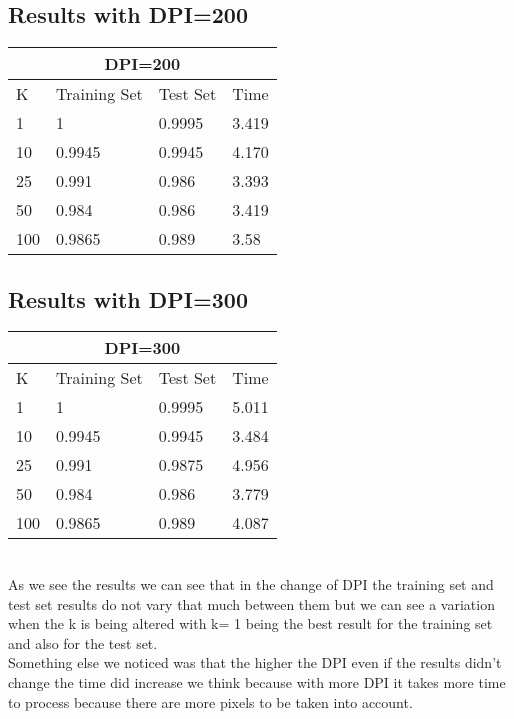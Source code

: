 \documentclass[paper=a4, fontsize=11pt]{scrartcl} %
\numberwithin{equation}{section} %
\numberwithin{figure}{section} %
\numberwithin{table}{section} %
\begin{document}
\subsection*{Results with DPI=200}
\begin{tabular}{ |p{3cm}|p{3cm}|p{3cm}|p{3cm}|  }
 \hline
 \multicolumn{4}{|c|}{DPI=200} \\
 \hline
 K & Training Set & Test Set & Time\\
 \hline
 1 & 1 & 0.9995 & 3.419\\
 10 & 0.9945 & 0.9945 & 4.170\\
 25 & 0.991 & 0.986 & 3.393\\
 50 & 0.984 & 0.986 & 3.419\\
 100 & 0.9865 & 0.989 & 3.58\\
 \hline
\end{tabular}

\subsection*{Results with DPI=300}
\begin{tabular}{ |p{3cm}|p{3cm}|p{3cm}|p{3cm}|  }
 \hline
 \multicolumn{4}{|c|}{DPI=300} \\
 \hline
 K & Training Set & Test Set & Time\\
 \hline
 1 & 1 & 0.9995 & 5.011\\
 10 & 0.9945 & 0.9945 & 3.484\\
 25 & 0.991 & 0.9875 & 4.956\\
 50 & 0.984 & 0.986 & 3.779\\
 100 & 0.9865 & 0.989 & 4.087\\
 \hline
\end{tabular}\\

As we see the results we can see that in the change of DPI the training set and test set results do not vary that much between them but we can see a variation when the k is being altered with k= 1 being the best result for the training set and also for the test set. \\

Something else we noticed was that the higher the DPI even if the results didn't change the time did increase we think because with more DPI it takes more time to process because there are more pixels to be taken into account.
\end{document}
